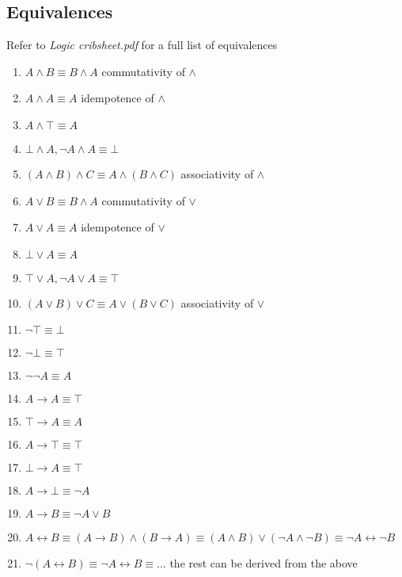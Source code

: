 \documentclass[a4paper, 12pt]{article}
\begin{document}
        \subsection*{Equivalences}
            Refer to \textit{Logic cribsheet.pdf} for a full list of equivalences
            \begin{enumerate}[1.]
                \itemsep0em
                \item $A \land B \equiv B \land A$ \hfill commutativity of $\land$
                \item $A \land A \equiv A$ \hfill idempotence of $\land$
                \item $A \land \top \equiv A$
                \item $\bot \land A, \neg A \land A \equiv \bot$
                \item $(A \land B) \land C \equiv A \land (B \land C)$ \hfill associativity of $\land$
                \item $A \lor B \equiv B \land A$ \hfill commutativity of $\lor$
                \item $A \lor A \equiv A$ \hfill idempotence of $\lor$
                \item $\bot \lor A \equiv A$
                \item $\top \lor A, \neg A \lor A \equiv \top$
                \item $(A \lor B) \lor C \equiv A \lor (B \lor C)$ \hfill associativity of $\lor$
                \item $\neg \top \equiv \bot$
                \item $\neg \bot \equiv \top$
                \item $\neg \neg A \equiv A$
                \item $A \rightarrow A \equiv \top$
                \item $\top \rightarrow A \equiv A$
                \item $A \rightarrow \top \equiv \top$
                \item $\bot \rightarrow A \equiv \top$
                \item $A \rightarrow \bot \equiv \neg A$
                \item $A \rightarrow B \equiv \neg A \lor B$
                \item $A \leftrightarrow B \equiv (A \rightarrow B) \land (B \rightarrow A) \equiv (A \land B) \lor (\neg A \land \neg B) \equiv \neg A \leftrightarrow \neg B$
                \item $\neg (A \leftrightarrow B) \equiv \neg A \leftrightarrow B \equiv ...$ \hfill the rest can be derived from the above

\end{enumerate}
\end{document}
